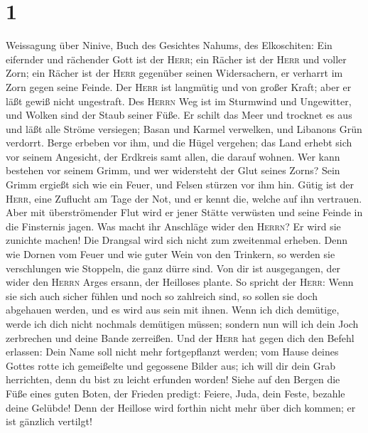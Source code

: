 \hypertarget{section}{%
\section{1}\label{section}}

 Weissagung über Ninive, Buch des Gesichtes Nahums, des
Elkoschiten:  Ein eifernder und rächender Gott ist der
\textsc{Herr}; ein Rächer ist der \textsc{Herr} und voller Zorn; ein
Rächer ist der \textsc{Herr} gegenüber seinen Widersachern, er verharrt
im Zorn gegen seine Feinde.  Der \textsc{Herr} ist
langmütig und von großer Kraft; aber er läßt gewiß nicht ungestraft. Des
\textsc{Herrn} Weg ist im Sturmwind und Ungewitter, und Wolken sind der
Staub seiner Füße.  Er schilt das Meer und trocknet es aus
und läßt alle Ströme versiegen; Basan und Karmel verwelken, und Libanons
Grün verdorrt.  Berge erbeben vor ihm, und die Hügel
vergehen; das Land erhebt sich vor seinem Angesicht, der Erdkreis samt
allen, die darauf wohnen.  Wer kann bestehen vor seinem
Grimm, und wer widersteht der Glut seines Zorns? Sein Grimm ergießt sich
wie ein Feuer, und Felsen stürzen vor ihm hin.  Gütig ist
der \textsc{Herr}, eine Zuflucht am Tage der Not, und er kennt die,
welche auf ihn vertrauen.  Aber mit überströmender Flut
wird er jener Stätte verwüsten und seine Feinde in die Finsternis jagen.
 Was macht ihr Anschläge wider den \textsc{Herrn}? Er wird
sie zunichte machen! Die Drangsal wird sich nicht zum zweitenmal
erheben.  Denn wie Dornen vom Feuer und wie guter Wein
von den Trinkern, so werden sie verschlungen wie Stoppeln, die ganz
dürre sind.  Von dir ist ausgegangen, der wider den
\textsc{Herrn} Arges ersann, der Heilloses plante.  So
spricht der \textsc{Herr}: Wenn sie sich auch sicher fühlen und noch so
zahlreich sind, so sollen sie doch abgehauen werden, und es wird aus
sein mit ihnen. Wenn ich dich demütige, werde ich dich nicht nochmals
demütigen müssen;  sondern nun will ich dein Joch
zerbrechen und deine Bande zerreißen.  Und der
\textsc{Herr} hat gegen dich den Befehl erlassen: Dein Name soll nicht
mehr fortgepflanzt werden; vom Hause deines Gottes rotte ich gemeißelte
und gegossene Bilder aus; ich will dir dein Grab herrichten, denn du
bist zu leicht erfunden worden!  Siehe auf den Bergen die
Füße eines guten Boten, der Frieden predigt: Feiere, Juda, dein Feste,
bezahle deine Gelübde! Denn der Heillose wird forthin nicht mehr über
dich kommen; er ist gänzlich vertilgt!

